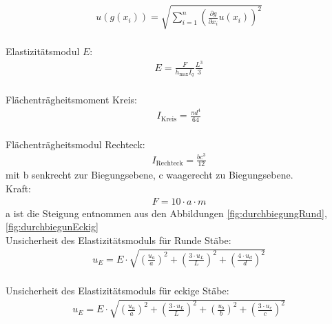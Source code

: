 \begin{align}
	u(g(x_i))=   \sqrt{  \sum_{i=1}^{n} \left( \frac{\partial g}{\partial x_i} u(x_i) \right)^2  }
	\label{eq:kombsu}       
\end{align}\\
Elastizitätsmodul $E$:
\begin{align}
	E=\frac{F}{h_{\text{max}} I_q}\frac{L^3}{3}
	\label{eq:Elast}
\end{align}
\\
Flächenträgheitsmoment Kreis:
\begin{align}
	I_{\text{Kreis}}=\frac{\pi d^4}{64}
		\label{eq:TrägKreis}
\end{align}
\\
Flächenträgheitsmodul Rechteck:
\begin{align}		
	I_{\text{Rechteck}}= \frac{bc^3}{12}
	\label{eq:TrägRecht}
\end{align}
mit b senkrecht zur Biegungsebene, c waagerecht zu Biegungsebene.
\\
Kraft:
\begin{align}
	F=10 \cdot a \cdot m
	\label{eq:Kraft}
\end{align}
	a ist die Steigung entnommen aus den Abbildungen \ref{fig:durchbiegungRund}, \ref{fig:durchbiegunEckig}
\\
Unsicherheit des Elastizitätsmoduls für Runde Stäbe:
\begin{align}
	u_E= E\cdot \sqrt{\left(\frac{u_a}{a}\right)^2+ \left(\frac{3\cdot u_L}{L}\right)^2 + \left( \frac{4 \cdot u_d}{d}\right)^2}
	\label{eq:UElastRund}
\end{align}	
\\
Unsicherheit des Elastizitätsmoduls für eckige Stäbe:
\begin{align}
	u_E= E \cdot \sqrt{ \left(\frac{u_a}{a}\right)^2 + \left( \frac{3 \cdot u_L}{L}\right)^2 + \left( \frac{u_b}{b}\right)^2 + \left(\frac{3 \cdot u_c}{c} \right)^2}
	\label{eq:UElastEckig}
\end{align}
	
	


